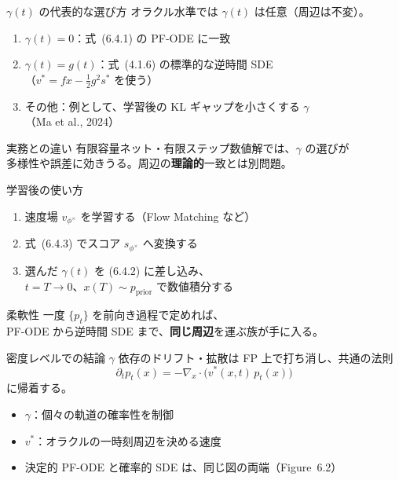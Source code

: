 \asmain
\begin{frame}{$\gamma(t)$ の代表的な選び方}
    オラクル水準では $\gamma(t)$ は任意（周辺は不変）。
    \begin{enumerate}
        \item $\gamma(t)=0$：式~(6.4.1) の PF-ODE に一致
        \item $\gamma(t)=g(t)$：式~(4.1.6) の標準的な逆時間 SDE\\
        （$v^{*}=f x-\tfrac12 g^{2}s^{*}$ を使う）
        \item その他：例として、学習後の KL ギャップを小さくする $\gamma$\\
        （Ma et al., 2024）
    \end{enumerate}
    \begin{alertblock}{実務との違い}
        有限容量ネット・有限ステップ数値解では、$\gamma$ の選びが\\
        多様性や誤差に効きうる。周辺の\textbf{理論的}一致とは別問題。
    \end{alertblock}
\end{frame}
\asmain
\begin{frame}{学習後の使い方}
    \begin{enumerate}
        \item 速度場 $v_{\phi^{\times}}$ を学習する（Flow Matching など）
        \item 式~(6.4.3) でスコア $s_{\phi^{\times}}$ へ変換する
        \item 選んだ $\gamma(t)$ を (6.4.2) に差し込み、\\
        $t=T\to 0$、$x(T)\sim p_{\mathrm{prior}}$ で数値積分する
    \end{enumerate}
    \begin{block}{柔軟性}
        一度 $\{p_t\}$ を前向き過程で定めれば、\\
        PF-ODE から逆時間 SDE まで、\textbf{同じ周辺}を運ぶ族が手に入る。
    \end{block}
\end{frame}
\asmain
\begin{frame}{密度レベルでの結論}
    $\gamma$ 依存のドリフト・拡散は FP 上で打ち消し、共通の法則
    \[
        \partial_t p_t(x)
        =
        -\nabla_x\cdot\bigl(v^{*}(x,t)\,p_t(x)\bigr)
    \]
    に帰着する。
    \begin{itemize}
        \item $\gamma$：個々の軌道の確率性を制御
        \item $v^{*}$：オラクルの一時刻周辺を決める速度
        \item 決定的 PF-ODE と確率的 SDE は、同じ図の両端（Figure~6.2）
    \end{itemize}
\end{frame}
